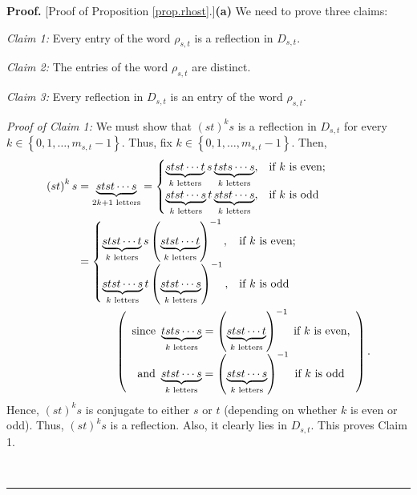 \documentclass
[numbers=enddot,12pt,final,onecolumn,notitlepage,abstracton]{scrartcl}%
\theoremstyle{definition}
\newenvironment{proof}[1][Proof]{\noindent\textbf{#1.} }{\ \rule{0.5em}{0.5em}}
\begin{document}
\begin{proof}
[Proof of Proposition \ref{prop.rhost}.]\textbf{(a)} We need to prove three claims:

\textit{Claim 1:} Every entry of the word $\rho_{s,t}$ is a reflection in
$D_{s,t}$.

\textit{Claim 2:} The entries of the word $\rho_{s,t}$ are distinct.

\textit{Claim 3:} Every reflection in $D_{s,t}$ is an entry of the word
$\rho_{s,t}$.

\textit{Proof of Claim 1:} We must show that $\left(  st\right)  ^{k}s$ is a
reflection in $D_{s,t}$ for every $k\in\left\{  0,1,\ldots,m_{s,t}-1\right\}
$. Thus, fix $k\in\left\{  0,1,\ldots,m_{s,t}-1\right\}  $. Then,%
\begin{align*}
\left(  st\right)  ^{k}s  &  =\underbrace{stst\cdots s}_{2k+1\text{ letters}}=%
\begin{cases}
\underbrace{stst\cdots t}_{k\text{ letters}}s\underbrace{tsts\cdots
s}_{k\text{ letters}}, & \text{if }k\text{ is even};\\
\underbrace{stst\cdots s}_{k\text{ letters}}t\underbrace{stst\cdots
s}_{k\text{ letters}}, & \text{if }k\text{ is odd}%
\end{cases}
\\
&  =%
\begin{cases}
\underbrace{stst\cdots t}_{k\text{ letters}}s\left(  \underbrace{stst\cdots
t}_{k\text{ letters}}\right)  ^{-1}, & \text{if }k\text{ is even};\\
\underbrace{stst\cdots s}_{k\text{ letters}}t\left(  \underbrace{stst\cdots
s}_{k\text{ letters}}\right)  ^{-1}, & \text{if }k\text{ is odd}%
\end{cases}
\\
&  \ \ \ \ \ \ \ \ \ \ \left(
\begin{array}
[c]{c}%
\text{since }\underbrace{tsts\cdots s}_{k\text{ letters}}=\left(
\underbrace{stst\cdots t}_{k\text{ letters}}\right)  ^{-1}\text{ if }k\text{
is even,}\\
\text{and }\underbrace{stst\cdots s}_{k\text{ letters}}=\left(
\underbrace{stst\cdots s}_{k\text{ letters}}\right)  ^{-1}\text{ if }k\text{
is odd}%
\end{array}
\right)  .
\end{align*}
Hence, $\left(  st\right)  ^{k}s$ is conjugate to either $s$ or $t$ (depending
on whether $k$ is even or odd). Thus, $\left(  st\right)  ^{k}s$ is a
reflection. Also, it clearly lies in $D_{s,t}$. This proves Claim 1.


\end{proof}
\end{document}
